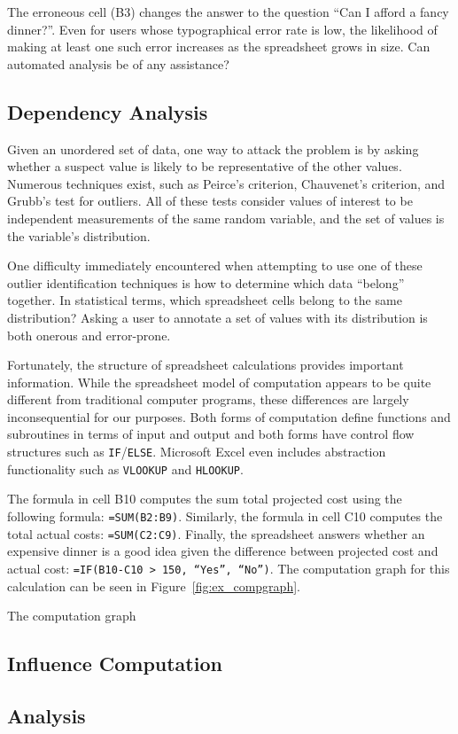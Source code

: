 The erroneous cell (B3) changes the answer to the question ``Can I afford a fancy dinner?''.  Even for users whose typographical error rate is low, the likelihood of making at least one such error increases as the spreadsheet grows in size.  Can automated analysis be of any assistance?

\subsection{Dependency Analysis}

Given an unordered set of data, one way to attack the problem is by asking whether a suspect value is likely to be representative of the other values.  Numerous techniques exist, such as Peirce's criterion, Chauvenet's criterion, and Grubb's test for outliers.  All of these tests consider values of interest to be independent measurements of the same random variable, and the set of values is the variable's distribution.

One difficulty immediately encountered when attempting to use one of these outlier identification techniques is how to determine which data ``belong'' together.  In statistical terms, which spreadsheet cells belong to the same distribution?  Asking a user to annotate a set of values with its distribution is both onerous and error-prone.

Fortunately, the structure of spreadsheet calculations provides important information.  While the spreadsheet model of computation appears to be quite different from traditional computer programs, these differences are largely inconsequential for our purposes.  Both forms of computation define functions and subroutines in terms of input and output and both forms have control flow structures such as \texttt{IF}/\texttt{ELSE}.  Microsoft Excel even includes abstraction functionality such as \texttt{VLOOKUP} and \texttt{HLOOKUP}.

The formula in cell B10 computes the sum total projected cost using the following formula: \texttt{=SUM(B2:B9)}.  Similarly, the formula in cell C10 computes the total actual costs: \texttt{=SUM(C2:C9)}.  Finally, the spreadsheet answers whether an expensive dinner is a good idea given the difference between projected cost and actual cost: \texttt{=IF(B10-C10 > 150, ``Yes'', ``No'')}.  The computation graph for this calculation can be seen in Figure~\ref{fig:ex_compgraph}.

The computation graph 

\subsection{Influence Computation}

\subsection{Analysis}
